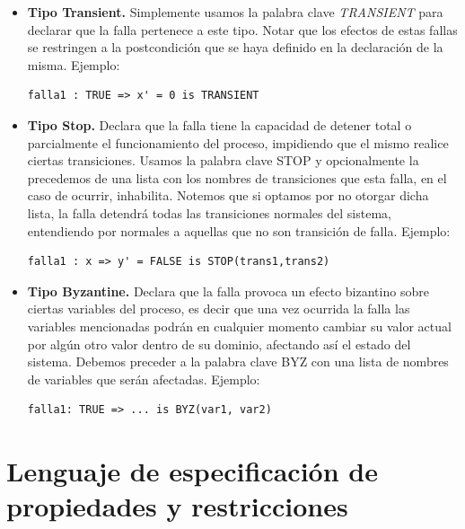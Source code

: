 \documentclass[titlepage, 12pt]{book}
\begin{document}
\begin{itemize}
\item \textbf{Tipo Transient.} Simplemente usamos la palabra clave \textit{TRANSIENT} para declarar que la falla pertenece a este tipo. Notar que los efectos de estas fallas se restringen a la postcondici\'on que se haya definido en la declaraci\'on de la misma. Ejemplo: \begin{verbatim}falla1 : TRUE => x' = 0 is TRANSIENT\end{verbatim}
\item \textbf{Tipo Stop.} Declara que la falla tiene la capacidad de detener total o parcialmente el funcionamiento del proceso, impidiendo que el mismo realice ciertas transiciones. Usamos la palabra clave STOP y opcionalmente la precedemos de una lista con los nombres de transiciones que esta falla, en el caso de ocurrir, inhabilita. Notemos que si optamos por no otorgar dicha lista, la falla detendr\'a todas las transiciones normales del sistema, entendiendo por normales a aquellas que no son transici\'on de falla. Ejemplo: \begin{verbatim}falla1 : x => y' = FALSE is STOP(trans1,trans2) \end{verbatim}
\item \textbf{Tipo Byzantine.} Declara que la falla provoca un efecto bizantino sobre ciertas variables del proceso, es decir que una vez ocurrida la falla las variables mencionadas podr\'an en cualquier momento cambiar su valor actual por alg\'un otro valor dentro de su dominio, afectando as\'i el estado del sistema. Debemos preceder a la palabra clave BYZ con una lista de nombres de variables que ser\'an afectadas. Ejemplo: \begin{verbatim}falla1: TRUE => ... is BYZ(var1, var2) \end{verbatim}
\end{itemize}

\section{Lenguaje de especificación de propiedades y restricciones}
\end{document}
